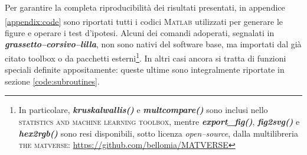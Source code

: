 Per garantire la completa riproducibilità dei risultati presentati, in appendice \ref{appendix:code} sono riportati tutti i codici \textsc{Matlab}\textsuperscript{\tiny\sffamily\textregistered} utilizzati per generare le figure e operare i test d'ipotesi. Alcuni dei comandi adoperati, segnalati in {\mlttfamily\color{xkcdLilac}\bfseries\itshape grassetto--corsivo--lilla}, non sono nativi del software base, ma importati dal già citato toolbox o da pacchetti esterni\footnote{In particolare, {\mlttfamily\bfseries\itshape\color{xkcdLilac}kruskalwallis()} e {\mlttfamily\bfseries\itshape\color{xkcdLilac}multcompare()} sono inclusi nello \textsc{statistics and machine learning toolbox}, mentre {\mlttfamily\bfseries\itshape\color{xkcdLilac}export\_fig()}, {\mlttfamily\bfseries\itshape\color{xkcdLilac}fig2svg()} e {\mlttfamily\bfseries\itshape\color{xkcdLilac}hex2rgb()} sono resi disponibili, sotto licenza \emph{open--source}, dalla multilibreria \textsc{the matverse}: \url{https://github.com/bellomia/MATVERSE} }. In altri casi ancora si tratta di funzioni speciali definite appositamente: queste ultime sono integralmente riportate in sezione \ref{code:subroutines}.




